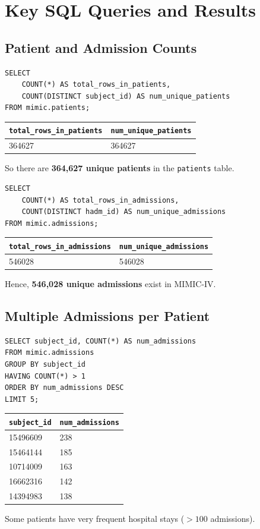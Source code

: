 \section{Key SQL Queries and Results}

\subsection{Patient and Admission Counts}
\begin{verbatim}
SELECT
    COUNT(*) AS total_rows_in_patients,
    COUNT(DISTINCT subject_id) AS num_unique_patients
FROM mimic.patients;
\end{verbatim}
\begin{center}
\begin{tabular}{l|l}
\hline
\texttt{total\_rows\_in\_patients} & \texttt{num\_unique\_patients} \\
\hline
364627 & 364627 \\
\hline
\end{tabular}
\end{center}
So there are \textbf{364,627 unique patients} in the \texttt{patients} table.

\begin{verbatim}
SELECT
    COUNT(*) AS total_rows_in_admissions,
    COUNT(DISTINCT hadm_id) AS num_unique_admissions
FROM mimic.admissions;
\end{verbatim}
\begin{center}
\begin{tabular}{l|l}
\hline
\texttt{total\_rows\_in\_admissions} & \texttt{num\_unique\_admissions} \\
\hline
546028 & 546028 \\
\hline
\end{tabular}
\end{center}
Hence, \textbf{546,028 unique admissions} exist in MIMIC-IV.

\subsection{Multiple Admissions per Patient}
\begin{verbatim}
SELECT subject_id, COUNT(*) AS num_admissions
FROM mimic.admissions
GROUP BY subject_id
HAVING COUNT(*) > 1
ORDER BY num_admissions DESC
LIMIT 5;
\end{verbatim}
\begin{center}
\begin{tabular}{l|l}
\hline
\texttt{subject\_id} & \texttt{num\_admissions} \\
\hline
15496609 & 238 \\
15464144 & 185 \\
10714009 & 163 \\
16662316 & 142 \\
14394983 & 138 \\
\hline
\end{tabular}
\end{center}
Some patients have very frequent hospital stays (\(>100\) admissions).

